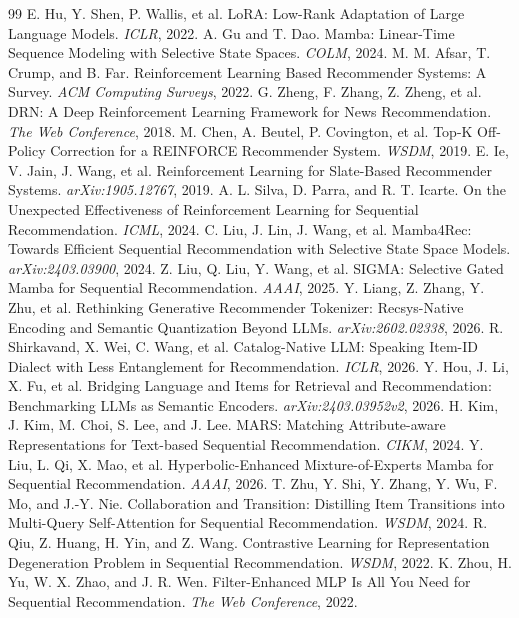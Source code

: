 \documentclass[11pt,a4paper]{article}
\begin{document}
\begin{thebibliography}{99}
 E. Hu, Y. Shen, P. Wallis, et al. LoRA: Low-Rank Adaptation of Large Language Models. \emph{ICLR}, 2022.
 A. Gu and T. Dao. Mamba: Linear-Time Sequence Modeling with Selective State Spaces. \emph{COLM}, 2024.
 M. M. Afsar, T. Crump, and B. Far. Reinforcement Learning Based Recommender Systems: A Survey. \emph{ACM Computing Surveys}, 2022.
 G. Zheng, F. Zhang, Z. Zheng, et al. DRN: A Deep Reinforcement Learning Framework for News Recommendation. \emph{The Web Conference}, 2018.
 M. Chen, A. Beutel, P. Covington, et al. Top-K Off-Policy Correction for a REINFORCE Recommender System. \emph{WSDM}, 2019.
 E. Ie, V. Jain, J. Wang, et al. Reinforcement Learning for Slate-Based Recommender Systems. \emph{arXiv:1905.12767}, 2019.
 A. L. Silva, D. Parra, and R. T. Icarte. On the Unexpected Effectiveness of Reinforcement Learning for Sequential Recommendation. \emph{ICML}, 2024.
 C. Liu, J. Lin, J. Wang, et al. Mamba4Rec: Towards Efficient Sequential Recommendation with Selective State Space Models. \emph{arXiv:2403.03900}, 2024.
 Z. Liu, Q. Liu, Y. Wang, et al. SIGMA: Selective Gated Mamba for Sequential Recommendation. \emph{AAAI}, 2025.
 Y. Liang, Z. Zhang, Y. Zhu, et al. Rethinking Generative Recommender Tokenizer: Recsys-Native Encoding and Semantic Quantization Beyond LLMs. \emph{arXiv:2602.02338}, 2026.
 R. Shirkavand, X. Wei, C. Wang, et al. Catalog-Native LLM: Speaking Item-ID Dialect with Less Entanglement for Recommendation. \emph{ICLR}, 2026.
 Y. Hou, J. Li, X. Fu, et al. Bridging Language and Items for Retrieval and Recommendation: Benchmarking LLMs as Semantic Encoders. \emph{arXiv:2403.03952v2}, 2026.
 H. Kim, J. Kim, M. Choi, S. Lee, and J. Lee. MARS: Matching Attribute-aware Representations for Text-based Sequential Recommendation. \emph{CIKM}, 2024.
 Y. Liu, L. Qi, X. Mao, et al. Hyperbolic-Enhanced Mixture-of-Experts Mamba for Sequential Recommendation. \emph{AAAI}, 2026.
 T. Zhu, Y. Shi, Y. Zhang, Y. Wu, F. Mo, and J.-Y. Nie. Collaboration and Transition: Distilling Item Transitions into Multi-Query Self-Attention for Sequential Recommendation. \emph{WSDM}, 2024.
 R. Qiu, Z. Huang, H. Yin, and Z. Wang. Contrastive Learning for Representation Degeneration Problem in Sequential Recommendation. \emph{WSDM}, 2022.
 K. Zhou, H. Yu, W. X. Zhao, and J. R. Wen. Filter-Enhanced MLP Is All You Need for Sequential Recommendation. \emph{The Web Conference}, 2022.

\end{thebibliography}
\end{document}

